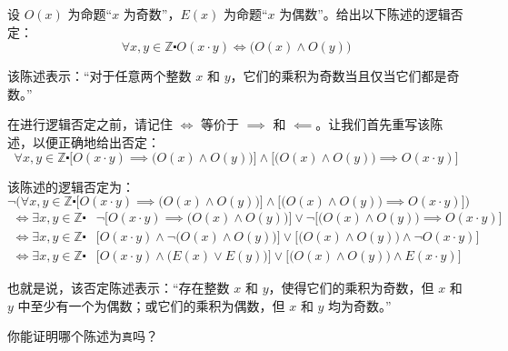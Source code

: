 \begin{example}
    设 $O(x)$ 为命题``$x$ 为奇数''，$E(x)$ 为命题``$x$ 为偶数''。给出以下陈述的逻辑否定：
    \[\forall x, y \in \mathbb{Z} \centerdot O(x \cdot y) \iff \big(O(x) \land O(y)\big)\]

    该陈述表示：``对于任意两个整数 $x$ 和 $y$，它们的乘积为奇数当且仅当它们都是奇数。''

    在进行逻辑否定之前，请记住 $\iff$ 等价于 $\implies$ 和 $\impliedby$。让我们首先重写该陈述，以便正确地给出否定：
    \[\forall x, y \in \mathbb{Z} \centerdot \Big[O(x \cdot y) \implies \big(O(x) \land O(y)\big)\Big] \land \Big[\big(O(x) \land O(y)\big) \implies O(x \cdot y)\Big]\]

    该陈述的逻辑否定为：
    \[\neg \bigg(\forall x, y \in \mathbb{Z} \centerdot \Big[O(x \cdot y) \implies \big(O(x) \land O(y)\big)\Big] \land \Big[\big(O(x) \land O(y)\big) \implies O(x \cdot y)\Big]\bigg) \]
    \begin{align*}
        \iff \exists x, y \in \mathbb{Z} \centerdot & \neg \Big[O(x \cdot y) \implies \big(O(x) \land O(y)\big)\Big] \lor \neg \Big[\big(O(x) \land O(y)\big) \implies O(x \cdot y)\Big] \\
        \iff \exists x, y \in \mathbb{Z} \centerdot & \Big[O(x \cdot y) \land \neg \big(O(x) \land O(y)\big)\Big] \lor \Big[\big(O(x) \land O(y)\big) \land \neg O(x \cdot y)\Big] \\
        \iff \exists x, y \in \mathbb{Z} \centerdot & \Big[O(x \cdot y) \land \big(E(x) \lor E(y)\big)\Big] \lor \Big[\big(O(x) \land O(y)\big) \land E(x \cdot y)\Big] 
    \end{align*}
    
    也就是说，该否定陈述表示：``存在整数 $x$ 和 $y$，使得它们的乘积为奇数，但 $x$ 和 $y$ 中至少有一个为偶数；或它们的乘积为偶数，但 $x$ 和 $y$ 均为奇数。''

    你能证明哪个陈述为\verb|真|吗？
\end{example}
